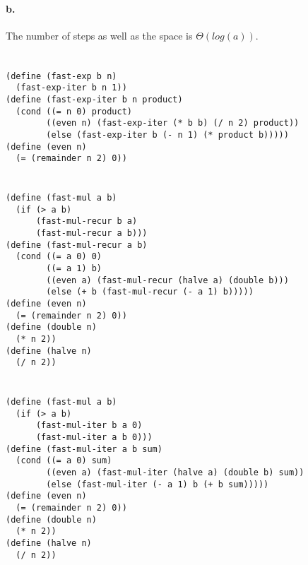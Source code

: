 \documentclass[a4paper]{report}
\begin{document}
\paragraph{b.}
The number of steps as well as the space is $\Theta(log(a))$.


\section{}

\begin{lstlisting}
(define (fast-exp b n)
  (fast-exp-iter b n 1))
(define (fast-exp-iter b n product)
  (cond ((= n 0) product)
        ((even n) (fast-exp-iter (* b b) (/ n 2) product))
        (else (fast-exp-iter b (- n 1) (* product b)))))
(define (even n)
  (= (remainder n 2) 0))
\end{lstlisting}


\section{}

\begin{lstlisting}
(define (fast-mul a b)
  (if (> a b)
      (fast-mul-recur b a)
      (fast-mul-recur a b)))
(define (fast-mul-recur a b)
  (cond ((= a 0) 0)
        ((= a 1) b)
        ((even a) (fast-mul-recur (halve a) (double b)))
        (else (+ b (fast-mul-recur (- a 1) b)))))
(define (even n)
  (= (remainder n 2) 0))
(define (double n)
  (* n 2))
(define (halve n)
  (/ n 2))
\end{lstlisting}


\section{}

\begin{lstlisting}
(define (fast-mul a b)
  (if (> a b)
      (fast-mul-iter b a 0)
      (fast-mul-iter a b 0)))
(define (fast-mul-iter a b sum)
  (cond ((= a 0) sum)
        ((even a) (fast-mul-iter (halve a) (double b) sum))
        (else (fast-mul-iter (- a 1) b (+ b sum)))))
(define (even n)
  (= (remainder n 2) 0))
(define (double n)
  (* n 2))
(define (halve n)
  (/ n 2))
\end{lstlisting}

\end{document}
